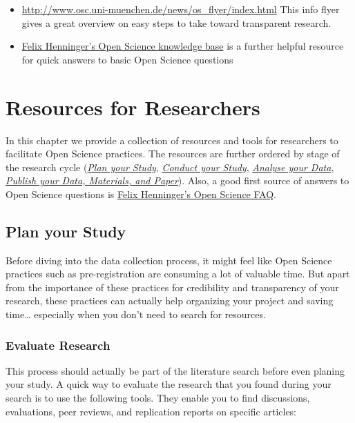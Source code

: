 \documentclass[12pt,]{report}
\providecommand{\tightlist}{%
  \setlength{\itemsep}{0pt}\setlength{\parskip}{0pt}}
\begin{document}
\begin{itemize}
\tightlist
\item
  \url{http://www.osc.uni-muenchen.de/news/os_flyer/index.html} This
  info flyer gives a great overview on easy steps to take toward
  transparent research.
\item
  \href{https://felixhenninger.gitbooks.io/open-science-knowledge-base/content/}{Felix
  Henninger's Open Science knowledge base} is a further helpful resource
  for quick answers to basic Open Science questions
\end{itemize}

\hypertarget{res_researchers}{\chapter{Resources for
Researchers}\label{res_researchers}}

In this chapter we provide a collection of resources and tools for
researchers to facilitate Open Science practices. The resources are
further ordered by stage of the research cycle
(\protect\hyperlink{plan}{\emph{Plan your Study}},
\protect\hyperlink{conduct}{\emph{Conduct your Study}},
\protect\hyperlink{analyse}{\emph{Analyse your Data}},
\protect\hyperlink{publish}{\emph{Publish your Data, Materials, and
Paper}}). Also, a good first source of answers to Open Science questions
is
\href{https://felixhenninger.gitbooks.io/open-science-knowledge-base/content/}{Felix
Henninger's Open Science FAQ}.

\hypertarget{plan}{\section{Plan your Study}\label{plan}}

Before diving into the data collection process, it might feel like Open
Science practices such as pre-registration are consuming a lot of
valuable time. But apart from the importance of these practices for
credibility and transparency of your research, these practices can
actually help organizing your project and saving time\ldots{} especially
when you don't need to search for resources.

\subsection{Evaluate Research}\label{evaluate-research}

This process should actually be part of the literature search before
even planing your study. A quick way to evaluate the research that you
found during your search is to use the following tools. They enable you
to find discussions, evaluations, peer reviews, and replication reports
on specific articles:
\end{document}
